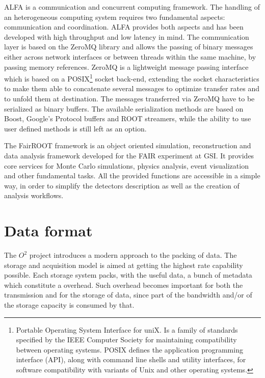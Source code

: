 ALFA is a communication and concurrent computing framework.
The handling of an heterogeneous computing system requires two fundamental aspects: communication and coordination.
ALFA provides both aspects and has been developed with high throughput and low latency in mind.
The communication layer is based on the ZeroMQ \cite{zeroMQ} library and allows the passing of binary messages either across network interfaces or between threads within the same machine, by passing memory references.
ZeroMQ is a lightweight message passing interface which is based on a POSIX\footnote{Portable Operating System Interface for uniX. Is a family of standards specified by the IEEE Computer Society for maintaining compatibility between operating systems. POSIX defines the application programming interface (API), along with command line shells and utility interfaces, for software compatibility with variants of Unix and other operating systems.} socket back-end, extending the socket characteristics to make them able to concatenate several messages to optimize transfer rates and to unfold them at destination.
The messages transferred via ZeroMQ have to be serialized as binary buffers.
The available serialization methods are based on Boost, Google's Protocol buffers \cite{googlepb} and ROOT streamers, while the ability to use user defined methods is still left as an option.

The FairROOT framework is an object oriented simulation, reconstruction and data analysis framework  developed for the FAIR experiment at GSI.
It provides core services for Monte Carlo simulations, physics analysis, event visualization and other fundamental tasks.
All the provided functions are accessible in a simple way, in order to simplify the detectors description as well as the creation of analysis workflows.

\section{Data format}
The $O^2$ project introduces a modern approach to the packing of data.
The storage and acquisition model is aimed at getting the highest rate capability possible.
Each storage system packs, with the useful data, a bunch of metadata which constitute a overhead.
Such overhead becomes important for both the transmission and for the storage of data, since part of the bandwidth and/or of the storage capacity is consumed by that.

